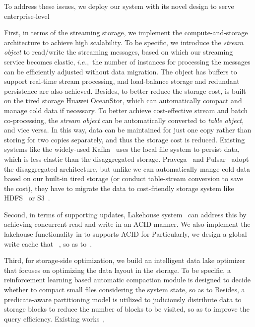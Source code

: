 To address these issues, we deploy our \sys system with its novel design to serve enterprise-level  


First, in terms of the streaming storage, we implement the compute-and-storage  architecture to achieve high scalability. To be specific, 
 we introduce the \textit{stream object}  to read/write the streaming messages, based on which our streaming service becomes elastic, $i.e.,$ the number of instances for processing the messages can be efficiently adjusted without data migration. The object has buffers to support real-time stream processing, and load-balance storage and redundant persistence are also achieved. 
Besides, to better reduce the storage cost,  \sys is built on the tired storage Huawei OceanStor, which can automatically compact and manage cold data if necessary.
To better achieve cost-effective stream and batch co-processing, the \textit{stream object}  can be automatically converted  to  \textit{table object}, and vice versa. In this way, data can be maintained for just one copy rather than storing for two copies separately, and thus the storage cost is reduced. 
Existing systems like the widely-used Kafka~\cite{} uses the local file system to persist data, which is less elastic than the disaggregated storage.  Pravega~\cite{} and Pulsar~\cite{} adopt the 
disaggregated architecture, but unlike we can automatically mange cold data based on our built-in tired storage (or conduct table-stream conversion to save the cost), they have to migrate the data to  cost-friendly storage system like  HDFS~\cite{} or S3~\cite{}.




Second, in terms of supporting updates, Lakehouse system~\cite{} can address this by achieving concurrent read and write in an ACID manner. We also implement the lakehouse functionality in \sys to supports ACID for  Particularly, we design a global write cache that ~, so as to~.

Third, for storage-side optimization, we build an intelligent data lake optimizer \brain that focuses on optimizing the data layout in the storage.%
 To be specific, a reinforcement learning based automatic compaction module is designed to decide whether to compact small files considering the system state, so as to  Besides, a predicate-aware partitioning model is utilized to judiciously distribute data to storage blocks to reduce the number of blocks to be visited, so as to improve the query efficiency.  Existing works~\cc{\cite{}},

